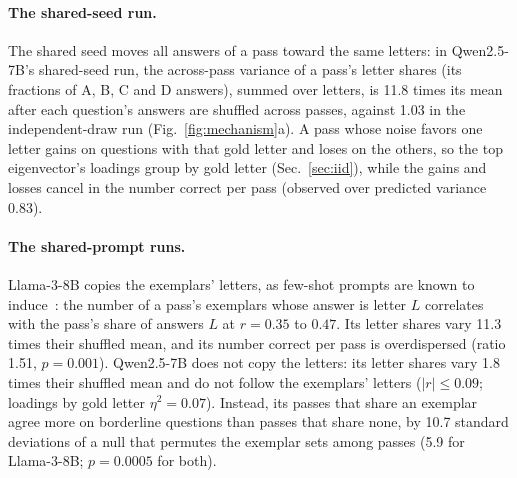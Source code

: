 \documentclass{article}
\theoremstyle{plain}
\theoremstyle{remark}
\begin{document}
\paragraph{The shared-seed run.} The shared seed moves all answers of a
pass toward the same letters: in Qwen2.5-7B's shared-seed run, the
across-pass variance of a pass's letter shares (its fractions of A, B, C
and D answers), summed over letters, is 11.8 times its mean after each
question's answers are shuffled across passes, against 1.03 in the
independent-draw run (Fig.~\ref{fig:mechanism}a). A pass whose noise
favors one letter gains on questions with that gold letter and loses on
the others, so the top eigenvector's loadings group by gold letter
(Sec.~\ref{sec:iid}), while the gains and losses cancel in the
number correct per pass (observed over predicted variance 0.83).

\paragraph{The shared-prompt runs.} Llama-3-8B copies the exemplars' letters, as
few-shot prompts are known to induce~\citep{zhao2021calibrate}: the
number of a pass's exemplars whose answer is letter $L$ correlates with
the pass's share of answers $L$ at $r=0.35$ to $0.47$. Its letter shares
vary 11.3 times their shuffled mean, and its number correct per pass is
overdispersed (ratio 1.51, $p=0.001$). Qwen2.5-7B does not copy the
letters: its letter shares vary 1.8 times their shuffled mean and do not
follow the exemplars' letters ($|r|\le0.09$; loadings by gold letter
$\eta^2=0.07$). Instead, its passes that share an exemplar agree more on borderline questions than
passes that share none, by 10.7 standard deviations of a null that
permutes the exemplar sets among passes (5.9 for Llama-3-8B; $p=0.0005$
for both).
\end{document}
